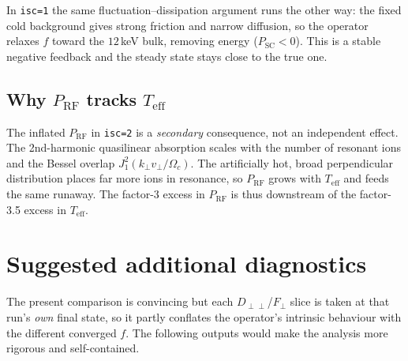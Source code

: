 \documentclass[11pt,a4paper]{article}
\begin{document}
In \texttt{isc=1} the same fluctuation--dissipation argument runs the other
way: the fixed cold background gives strong friction and narrow diffusion, so
the operator relaxes $f$ toward the $12$\,keV bulk, removing energy
($P_\text{SC} < 0$). This is a stable negative feedback and the steady state
stays close to the true one.

\subsection{Why \texorpdfstring{$P_\text{RF}$}{P\_RF} tracks \texorpdfstring{$T_\text{eff}$}{Teff}}

The inflated $P_\text{RF}$ in \texttt{isc=2} is a \emph{secondary}
consequence, not an independent effect. The 2nd-harmonic quasilinear
absorption scales with the number of resonant ions and the Bessel overlap
$J_1^2(k_\perp v_\perp/\Omega_c)$. The artificially hot, broad perpendicular
distribution places far more ions in resonance, so $P_\text{RF}$ grows with
$T_\text{eff}$ and feeds the same runaway. The factor-3 excess in
$P_\text{RF}$ is thus downstream of the factor-3.5 excess in $T_\text{eff}$.

\section{Suggested additional diagnostics}

The present comparison is convincing but each $D_{\perp\perp}$/$F_\perp$
slice is taken at that run's \emph{own} final state, so it partly conflates
the operator's intrinsic behaviour with the different converged $f$. The
following outputs would make the analysis more rigorous and self-contained.
\end{document}
